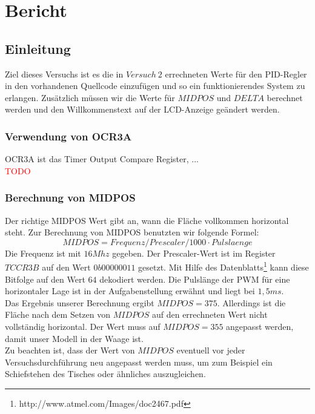 \section{Bericht}

\subsection{Einleitung}
Ziel dieses Versuchs ist es die in $Versuch\ 2$ errechneten Werte für den PID-Regler in den vorhandenen Quellcode einzufügen und so ein funktionierendes System zu erlangen. Zusätzlich müssen wir die Werte für $MIDPOS$ und $DELTA$ berechnet werden und den Willkommenstext auf der LCD-Anzeige geändert werden. 

\subsubsection{Verwendung von OCR3A}
OCR3A ist das Timer Output Compare Register, ...\\
\textcolor{red}{TODO}

\subsubsection{Berechnung von MIDPOS}
Der richtige MIDPOS Wert gibt an, wann die Fläche vollkommen horizontal steht. Zur Berechnung von MIDPOS benutzten wir folgende Formel: \\
\begin{equation}
MIDPOS  = Frequenz / Prescaler / 1000 \cdot Pulslaenge
\end{equation}
Die Frequenz ist mit $16 Mhz$ gegeben. Der Prescaler-Wert ist im Register $TCCR3B$ auf den Wert $0b00000011$ gesetzt. Mit Hilfe des Datenblatts\footnote{http://www.atmel.com/Images/doc2467.pdf} kann diese Bitfolge auf den Wert $64$ dekodiert werden. Die Pulslänge der PWM für eine horizontaler Lage ist in der Aufgabenstellung erwähnt und liegt bei $1,5 ms$.\\
Das Ergebnis unserer Berechnung ergibt $MIDPOS = 375$. Allerdings ist die Fläche nach dem Setzen von $MIDPOS$ auf den errechneten Wert nicht vollständig horizontal. Der Wert muss auf $MIDPOS = 355$ angepasst werden, damit unser Modell in der Waage ist. \\ 
Zu beachten ist, dass der Wert von $MIDPOS$ eventuell vor jeder Versuchsdurchführung neu angepasst werden muss, um zum Beispiel ein Schiefstehen des Tisches oder ähnliches auszugleichen.

